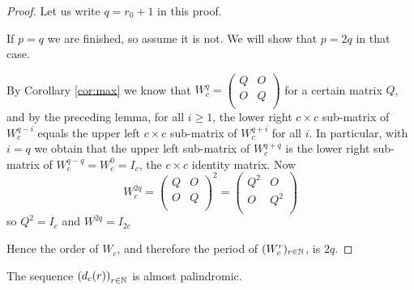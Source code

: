 \begin{proof}
  Let us write $q=r_0+1$ in this proof.

  If $p=q$ we are finished, so assume it is not. We will show that $p=2q$ in
  that case.

  By Corollary \ref{cor:max} we know that 
  $W_{c}^{q}=\left(\begin{smallmatrix} Q & O \\ O & Q \\\end{smallmatrix}\right)$
  for a certain matrix $Q$, and by the preceding lemma, for all $i\geq 1$,
  the lower right $c\times c$ sub-matrix of
  $W_{c}^{q-i}$ equals the upper left $c\times c$ sub-matrix of $W_{c}^{q+i}$
  for all $i$. In particular, with $i=q$ we obtain that
  the upper left sub-matrix of $W_{c}^{q+q}$ is the lower right sub-matrix of
  $W_{c}^{q-q} = W_{c}^{0} = I_{c}$, the $c\times c$ identity matrix.
  Now
  \[
  W_{c}^{2q}
  =
  \left(
  \begin{array}{cc}
    Q & O \\
    O & Q \\
  \end{array}
  \right)^{2}
  =
  \left(
  \begin{array}{cc}
    Q^{2} & O \\
    O & Q^{2} \\
  \end{array}
  \right)
  \]
  so $Q^{2}=I_{c}$ and $W^{2q}=I_{2c}$
  
  Hence the order of $W_{c}$, and therefore the period of $(W_{c}^{r})_{r\in\mathbb{N}}$, is $2q$.
\end{proof}

\begin{theorem}[Observation 5]
  The sequence $\left(d_{c}(r)\right)_{r\in\mathbb{N}}$
  is almost palindromic.
\end{theorem}

